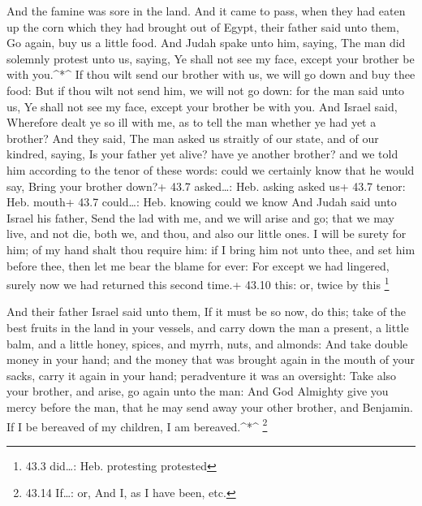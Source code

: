  And the famine was sore in the land.  And it
came to pass, when they had eaten up the corn which they had brought out
of Egypt, their father said unto them, Go again, buy us a little food.
 And Judah spake unto him, saying, The man did solemnly
protest unto us, saying, Ye shall not see my face, except your brother
be with you.\^{}*\^{}  If thou wilt send our brother with
us, we will go down and buy thee food:  But if thou wilt not
send him, we will not go down: for the man said unto us, Ye shall not
see my face, except your brother be with you.  And Israel
said, Wherefore dealt ye so ill with me, as to tell the man whether ye
had yet a brother?  And they said, The man asked us straitly
of our state, and of our kindred, saying, Is your father yet alive? have
ye another brother? and we told him according to the tenor of these
words: could we certainly know that he would say, Bring your brother
down?+ 43.7 asked\ldots: Heb. asking asked us+ 43.7 tenor: Heb. mouth+
43.7 could\ldots: Heb. knowing could we know  And Judah said
unto Israel his father, Send the lad with me, and we will arise and go;
that we may live, and not die, both we, and thou, and also our little
ones.  I will be surety for him; of my hand shalt thou
require him: if I bring him not unto thee, and set him before thee, then
let me bear the blame for ever:  For except we had
lingered, surely now we had returned this second time.+ 43.10 this: or,
twice by this \footnote{43.3 did\ldots: Heb. protesting protested}

 And their father Israel said unto them, If it must be so
now, do this; take of the best fruits in the land in your vessels, and
carry down the man a present, a little balm, and a little honey, spices,
and myrrh, nuts, and almonds:  And take double money in
your hand; and the money that was brought again in the mouth of your
sacks, carry it again in your hand; peradventure it was an oversight:
 Take also your brother, and arise, go again unto the man:
 And God Almighty give you mercy before the man, that he
may send away your other brother, and Benjamin. If I be bereaved of my
children, I am bereaved.\^{}*\^{} \footnote{43.14 If\ldots: or, And I,
  as I have been, etc.}

